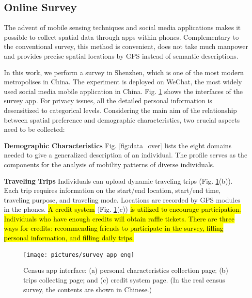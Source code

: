\documentclass{ieeeaccess}
\begin{document}
\subsection{Online Survey}

The advent of mobile sensing techniques and social media applications makes it possible to collect spatial data through apps within phones. Complementary to the conventional survey, this method is convenient, does not take much manpower and provides precise spatial locations by GPS instead of semantic descriptions.

In this work, we perform a survey in Shenzhen, which is one of the most modern metropolises in China. The experiment is deployed on WeChat, the most widely used social media mobile application in China. Fig. \ref{fig:app} shows the interfaces of the survey app. For privacy issues, all the detailed personal information is desensitized to categorical levels. Considering the main aim of the relationship between spatial preference and demographic characteristics, two crucial aspects need to be collected:

\textbf{Demographic Characteristics} Fig. \ref{fig:data_over} lists the eight domains needed to give a generalized description of an individual. The profile serves as the components for the analysis of mobility patterns of diverse individuals.

\textbf{Traveling Trips} Individuals can upload dynamic traveling trips (Fig. \ref{fig:app}(b)). Each trip requires information on the start/end location, start/end time, traveling purpose, and traveling mode. Locations are recorded by GPS modules in the phones. \hl{A credit system} (Fig. \ref{fig:app}(c)) \hl{is utilized to encourage participation. Individuals who have enough credits will obtain raffle tickets. There are three ways for credits: recommending friends to participate in the survey, filling personal information, and filling daily trips.}


\begin{figure}
 \centering
 \texttt{[image: pictures/survey\_app\_eng]}
  \captionsetup{justification=centering}
 \caption{Census app interface: (a) personal characteristics collection page; (b) trips collecting page; and (c) credit system page. (In the real census survey, the contents are shown in Chinese.)}
 \label{fig:app}
\end{figure}
\end{document}
